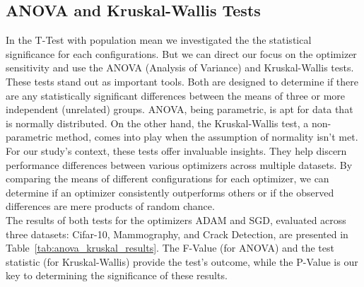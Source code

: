 \subsection{ANOVA and Kruskal-Wallis Tests}

In the T-Test with population mean we investigated the the statistical significance for
each configurations. But we can direct our focus on the optimizer sensitivity and use the ANOVA (Analysis of Variance) and Kruskal-Wallis tests. These tests stand out as important tools. Both are designed to determine if there are any statistically significant differences between the means of three or more independent (unrelated) groups. ANOVA, being parametric, is apt for data that is normally distributed. On the other hand, the Kruskal-Wallis test, a non-parametric method, comes into play when the assumption of normality isn't met.\\

For our study's context, these tests offer invaluable insights. They help discern performance differences between various optimizers across multiple datasets. By comparing the means of different configurations for each optimizer, we can determine if an optimizer consistently outperforms others or if the observed differences are mere products of random chance.\\

The results of both tests for the optimizers ADAM and SGD, evaluated across three datasets: Cifar-10, Mammography, and Crack Detection, are presented in Table~\ref{tab:anova_kruskal_results}. The F-Value (for ANOVA) and the test statistic (for Kruskal-Wallis) provide the test's outcome, while the P-Value is our key to determining the significance of these results.\\

